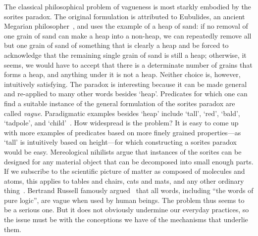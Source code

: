 \documentclass[a4paper]{article}
\begin{document}
The classical philosophical problem of vagueness is most starkly embodied by the sorites paradox.
The original formulation is attributed to Eubulides, an ancient Megarian philosopher~\parencite{sorensen_sorites_2009}, and uses the example of a heap of sand: if no removal of one grain of sand can make a heap into a non-heap, we can repeatedly remove all but one grain of sand of something that is clearly a heap and be forced to acknowledge that the remaining single grain of sand is still a heap; otherwise, it seems, we would have to accept that there is a determinate number of grains that forms a heap, and anything under it is not a heap.
Neither choice is, however, intuitively satisfying.
The paradox is interesting because it can be made general and re-applied to many other words besides `heap'.
Predicates for which one can find a suitable instance of the general formulation of the sorites paradox are called \emph{vague}.
Paradigmatic examples besides `heap' include `tall', `red', `bald', `tadpole', and `child'~\parencite{Keefe1997}.
How widespread is the problem?
It is easy to come up with more examples of predicates based on more finely grained properties---as `tall' is intuitively based on height---for which constructing a sorites paradox would be easy.
Mereological nihilists argue that instances of the sorites can be designed for any material object that can be decomposed into small enough parts.
If we subscribe to the scientific picture of matter as composed of molecules and atoms, this applies to tables and chairs, cats and mats, and any other ordinary thing~\parencite{Unger1979}.
Bertrand Russell famously argued~\parencite*{russell_vagueness_1923} that all words, including ``the words of pure logic'', are vague when used by human beings.
The problem thus seems to be a serious one.
But it does not obviously undermine our everyday practices, so the issue must be with the conceptions we have of the mechanisms that underlie them.
\end{document}
